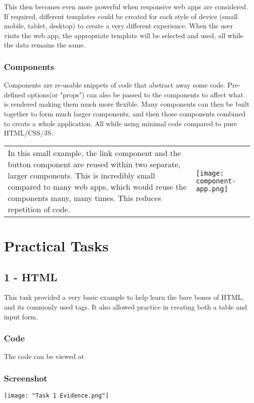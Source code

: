 \documentclass[12pt]{report}
\newcommand{\splitpage}[2]{\begin{tabular}{l l}\begin{minipage}{0.5\textwidth}#1\end{minipage}&\begin{minipage}{0.5\textwidth}#2\end{minipage}\end{tabular}}
\begin{document}
					 This then becomes even more powerful when responsive web apps are considered. If required, different templates could be created for each style of device (small mobile, tablet, desktop) to create a very different experience. When the user visits the web app, the appropriate template will be selected and used, all while the data remains the same.\\


					\subsubsection{Components}
						Components are re-usable snippets of code that abstract away some code. Pre-defined options(or "props") can also be passed to the components to affect what is rendered making them much more flexible. Many components can then be built together to form much larger components, and then those components combined to create a whole application. All while using minimal code compared to pure HTML/CSS/JS. \\

				\hspace{-0.8cm}
				\splitpage{
					In this small example, the link component and the button component are reused within two separate, larger components. This is incredibly small compared to many web apps, which would reuse the components many, many times. This reduces repetition of code. \autocite{vue-component}
				}{
					\texttt{[image: component-app.png]}
}


		\section{Practical Tasks}
			\subsection{1 - HTML}
				 This task provided a very basic example to help learn the bare bones of HTML, and its commonly used tags. It also allowed practice in creating both a table and input form.
				\subsubsection{Code}
				The code can be viewed at 


				\subsubsection{Screenshot}
					\label{task-1.1}
					\texttt{[image: "Task 1 Evidence.png"]}
\end{document}

